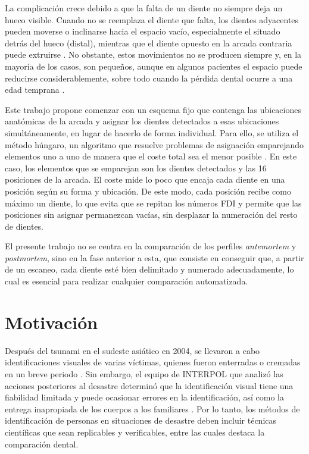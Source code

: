 La complicación crece debido a que la falta de un diente no siempre deja un hueco visible. Cuando no se reemplaza el diente que falta, los dientes adyacentes pueden moverse o inclinarse hacia el espacio vacío, especialmente el situado detrás del hueco (distal), mientras que el diente opuesto en la arcada contraria puede extruirse \cite{craddockOcclusalChangesFollowing2007a, craddockOcclusalChangesFollowing2007b, loveToothMovementEdentulous1971}. No obstante, estos movimientos no se producen siempre y, en la mayoría de los casos, son pequeños, aunque en algunos pacientes el espacio puede reducirse considerablemente, sobre todo cuando la pérdida dental ocurre a una edad temprana \cite{loveToothMovementEdentulous1971, shugarsConsequencesNotReplacing2000}.

Este trabajo propone comenzar con un esquema fijo que contenga las ubicaciones anatómicas de la arcada y asignar los dientes detectados a esas ubicaciones simultáneamente, en lugar de hacerlo de forma individual. Para ello, se utiliza el método húngaro, un algoritmo que resuelve problemas de asignación emparejando elementos uno a uno de manera que el coste total sea el menor posible \cite{kuhnHungarianMethodAssignment1955}. En este caso, los elementos que se emparejan son los dientes detectados y las 16 posiciones de la arcada. El coste mide lo poco que encaja cada diente en una posición según su forma y ubicación. De este modo, cada posición recibe como máximo un diente, lo que evita que se repitan los números FDI y permite que las posiciones sin asignar permanezcan vacías, sin desplazar la numeración del resto de dientes.

El presente trabajo no se centra en la comparación de los perfiles \textit{antemortem} y \textit{postmortem}, sino en la fase anterior a esta, que consiste en conseguir que, a partir de un escaneo, cada diente esté bien delimitado y numerado adecuadamente, lo cual es esencial para realizar cualquier comparación automatizada.

\section{Motivación}
\label{sec:motivacion}

Después del tsunami en el sudeste asiático en 2004, se llevaron a cabo identificaciones visuales de varias víctimas, quienes fueron enterradas o cremadas en un breve periodo \cite{forrestForensicOdontologyDVI2019}. Sin embargo, el equipo de INTERPOL que analizó las acciones posteriores al desastre determinó que la identificación visual tiene una fiabilidad limitada y puede ocasionar errores en la identificación, así como la entrega inapropiada de los cuerpos a los familiares \cite{forrestForensicOdontologyDVI2019}. Por lo tanto, los métodos de identificación de personas en situaciones de desastre deben incluir técnicas científicas que sean replicables y verificables, entre las cuales destaca la comparación dental.

